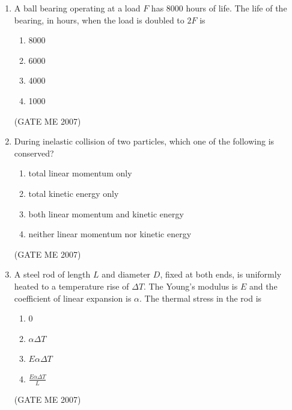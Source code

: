 \documentclass[journal]{IEEEtran}
\begin{document}
\begin{enumerate}
\begin{multicols}{4}
\begin{enumerate}
\item 25
\item 30
\item 35
\item 60
\end{enumerate}
\end{multicols}
\hfill (GATE ME 2007)

\item A ball bearing operating at a load \( F \) has 8000 hours of life. The life of the bearing, in hours, when the load is doubled to \( 2F \) is
\begin{multicols}{4}
\begin{enumerate}
\item 8000
\item 6000
\item 4000
\item 1000
\end{enumerate}
\end{multicols}
\hfill (GATE ME 2007)

\item During inelastic collision of two particles, which one of the following is conserved?
\begin{enumerate}
\item total linear momentum only
\item total kinetic energy only
\item both linear momentum and kinetic energy
\item neither linear momentum nor kinetic energy
\end{enumerate}
\hfill (GATE ME 2007)

\item A steel rod of length \( L \) and diameter \( D \), fixed at both ends, is uniformly heated to a temperature rise of \( \Delta T \). The Young's modulus is \( E \) and the coefficient of linear expansion is \( \alpha \). The thermal stress in the rod is
\begin{multicols}{4}
\begin{enumerate}
\item 0
\item \( \alpha \Delta T \)
\item \( E \alpha \Delta T \)
\item \( \frac{E \alpha \Delta T}{L} \)
\end{enumerate}
\end{multicols}
\hfill (GATE ME 2007)


\end{enumerate}
\end{document}
